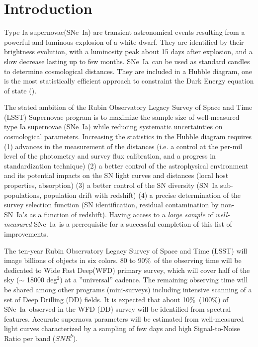 \documentclass[skiphelvet,twocolumn]{aastex63}
\newcommand{\snrb}{\mbox{$SNR^b$}}
\newcommand{\sne}{{SNe~Ia}}
\newcommand{\degsq}{{deg$^2$}}
\newcommand{\per}{$\%$}
\begin{document}



\section{Introduction}
\label{sec:intro}
Type Ia supernovae(\sne) are transient astronomical events resulting from a powerful and luminous explosion of a white dwarf. They are identified by their brightness evolution, with a luminosity peak about 15 days after explosion, and a slow decrease lasting up to few months. \sne~can be used as standard candles to determine cosmological distances. They are included in a Hubble diagram, one is the most statistically efficient approach to constraint the Dark Energy equation of state (\citealt{Betoule_2014,Scolnic_2018}).
\par
The stated ambition of the Rubin Observatory Legacy Survey of Space and Time (LSST) Supernovae program is to maximize the sample size of well-measured type Ia supernovae (\sne) while reducing systematic uncertainties on cosmological parameters. Increasing the statistics in the Hubble diagram requires (1) advances in the measurement of the distances (i.e.  a control at the per-mil level of the photometry and survey flux calibration, and a progress in standardization technique) (2) a better control of the astrophysical environment and its potential impacts on the SN light curves and distances (local host properties, absorption) (3) a better control of the SN diversity (SN~Ia sub-populations, population drift with redshift) (4) a precise determination of the survey selection function (SN identification, residual contamination by non-SN~Ia's as a function of redshift). Having access to a {\it large sample} of {\it well-measured} \sne~is a prerequisite for a successful completion of this list of improvements.
\par
The ten-year Rubin Observatory Legacy Survey of Space and Time (LSST) will image billions of objects in six colors. 80 to 90\per~of the observing time will be dedicated to Wide Fast Deep(WFD) primary survey, which will cover half of the sky ($\sim$ 18000 \degsq) at a ''universal'' cadence. The remaining observing time will be shared among other programs (mini-surveys) including intensive scanning of a set of Deep Drilling (DD) fields. It is expected that about 10\per~(100\per) of \sne~observed in the WFD (DD) survey will be identified from spectral features. Accurate supernova parameters will be estimated from well-measured light curves characterized by a sampling of few days and high Signal-to-Noise Ratio per band (\snrb).  %
\end{document}
